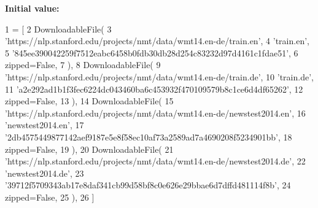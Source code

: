 {\bfseries Initial value\+:}
\begin{DoxyCode}
1 =  [
2     DownloadableFile(
3         \textcolor{stringliteral}{'https://nlp.stanford.edu/projects/nmt/data/wmt14.en-de/train.en'},
4         \textcolor{stringliteral}{'train.en'},
5         \textcolor{stringliteral}{'845ee390042259f7512eabc6458b0fdb30db28d254c83232d97d4161c1fdae51'},
6         zipped=\textcolor{keyword}{False},
7     ),
8     DownloadableFile(
9         \textcolor{stringliteral}{'https://nlp.stanford.edu/projects/nmt/data/wmt14.en-de/train.de'},
10         \textcolor{stringliteral}{'train.de'},
11         \textcolor{stringliteral}{'a2e292ad1b1f3fec6224dc043460ba6c453932f470109579b8c1ce6d4df65262'},
12         zipped=\textcolor{keyword}{False},
13     ),
14     DownloadableFile(
15         \textcolor{stringliteral}{'https://nlp.stanford.edu/projects/nmt/data/wmt14.en-de/newstest2014.en'},
16         \textcolor{stringliteral}{'newstest2014.en'},
17         \textcolor{stringliteral}{'2db4575449877142aef9187e5e8f58ec10af73a2589ad7a4690208f5234901bb'},
18         zipped=\textcolor{keyword}{False},
19     ),
20     DownloadableFile(
21         \textcolor{stringliteral}{'https://nlp.stanford.edu/projects/nmt/data/wmt14.en-de/newstest2014.de'},
22         \textcolor{stringliteral}{'newstest2014.de'},
23         \textcolor{stringliteral}{'39712f5709343ab17e8daf341cb99d58bf8c0e626e29bbae6d7dffd481114f8b'},
24         zipped=\textcolor{keyword}{False},
25     ),
26 ]
\end{DoxyCode}
